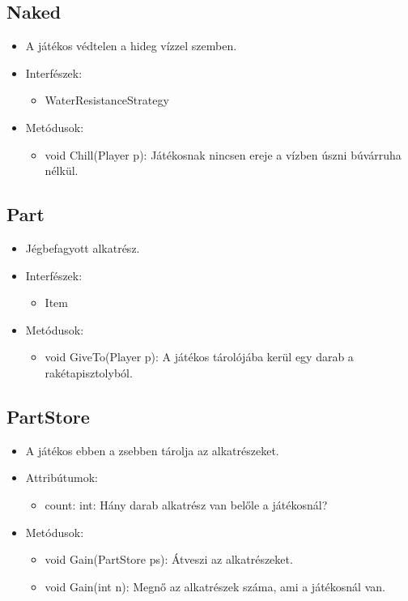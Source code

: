 \subsection{Naked}
\begin{itemize}
	\item A játékos védtelen a hideg vízzel szemben.		
	\item Interfészek:
	\begin{itemize}
		\item WaterResistanceStrategy
	\end{itemize}
	\item Metódusok:
	\begin{itemize}
		\item void Chill(Player p): Játékosnak nincsen ereje a vízben úszni búvárruha nélkül.
	\end{itemize}
\end{itemize}

\subsection{Part}
\begin{itemize}
		\item Jégbefagyott alkatrész.
	\item Interfészek:
	\begin{itemize}
		\item Item
	\end{itemize}
	\item Metódusok:
	\begin{itemize}
		\item void GiveTo(Player p): A játékos tárolójába kerül egy darab a rakétapisztolyból.
	\end{itemize}
\end{itemize}

\subsection{PartStore}
\begin{itemize}
	\item A játékos ebben a zsebben tárolja az alkatrészeket.	
	\item Attribútumok:
	\begin{itemize}
		\item count: int: Hány darab alkatrész van belőle a játékosnál?
	\end{itemize}
	\item Metódusok:
	\begin{itemize}
		\item void Gain(PartStore ps): Átveszi az alkatrészeket.
		\item void Gain(int n): Megnő az alkatrészek száma, ami a játékosnál van.
	\end{itemize}
\end{itemize}

